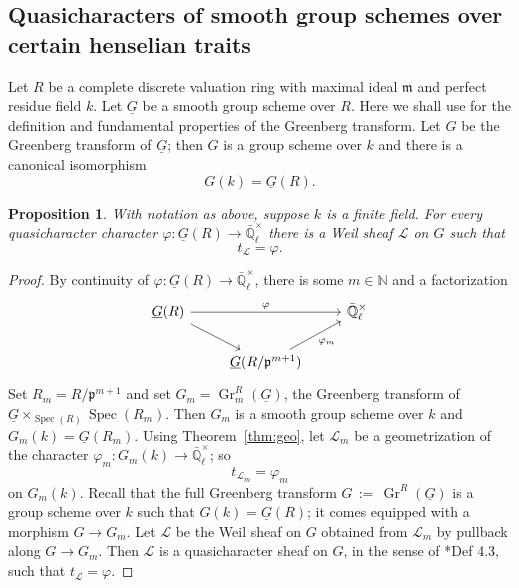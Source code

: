 \documentclass[10pt]{amsart}
\theoremstyle{plain}
\newtheorem{proposition}[theorem]{Proposition}
\theoremstyle{definition}
\newcommand{\NN}{{\mathbb{N}}}
\newcommand{\EE}{\mathbb{\bar Q}_\ell}
\newcommand{\Fq}{k}
\newcommand{\EEx}{\EE^\times}
\DeclareMathOperator{\Gr}{Gr}
\newcommand{\Spec}[1]{{\operatorname{Spec}(#1)}}
\newcommand{\ceq}{{\, :=\, }}
\newcommand{\trFrob}[1]{t_{#1}}
\newcommand{\cs}[1]{{\mathcal{#1}}}
\begin{document}
\subsection{Quasicharacters of smooth group schemes over certain henselian traits}


Let $R$ be a complete discrete valuation ring with maximal ideal $\mathfrak{m}$ and perfect residue field $\Fq$. 
Let $\underline{G}$ be a smooth group scheme over $R$.
Here we shall use  \cite{bertapelle-gonzales:Greenberg} for the definition and fundamental properties of the Greenberg transform.
Let $G$ be the Greenberg transform of $\underline{G}$; then $G$ is a group scheme over $\Fq$ and there is a canonical isomorphism
\[
G(\Fq) = \underline{G}(R).
\]

\begin{proposition}\label{prop:quasicharacters}
With notation as above, suppose $\Fq$ is a finite field.
For every quasicharacter character $\varphi : \underline{G}(R) \to \EEx$ there is a Weil sheaf $\cs{L}$ on $G$ such that \[\trFrob{\cs{L}} =  \varphi.\] \end{proposition}

\begin{proof}
By continuity of $\varphi : \underline{G}(R) \to \EE^\times$, there is some $m \in \NN$ and a factorization
\[
\begin{tikzcd}
\underline{G}(R) \arrow{rr}{\varphi} \arrow{rd} && \EEx\\
& \underline{G}(R/\mathfrak{p}^{m+1}) \arrow{ru}[swap]{\varphi_m} 
\end{tikzcd}
\] 
Set $R_m = R/\mathfrak{p}^{m+1}$ and
set $G_m = \Gr_m^{R}(\underline{G})$, the Greenberg transform of $\underline{G}\times_{\Spec{R}}\Spec{R_m}$.
Then $G_m$ is a smooth group scheme over $\Fq$ and $G_m(\Fq) = \underline{G}(R_m)$.
Using Theorem~\ref{thm:geo}, let $\cs{L}_m$ be a geometrization of the character $\varphi_m: G_m(\Fq) \to \EEx$; so
\[
\trFrob{\cs{L}_m} = \varphi_m
\]
on $G_m(\Fq)$.
%
Recall that the full Greenberg transform $G \ceq \Gr^{R}(\underline{G})$ is a group scheme over $\Fq$ such that $G(\Fq) = \underline{G}(R)$; it comes equipped with a morphism $G \to G_m$.
Let $\cs{L}$ be the  Weil sheaf on $G$ obtained from $\cs{L}_m$ by pullback along $G \to G_m$. 
Then $\cs{L}$ is a quasicharacter sheaf on $G$, in the sense of \cite{cunningham-roe:13a}*{Def 4.3}, such that $\trFrob{\cs{L}} = \varphi$.
\end{proof}
\end{document}
